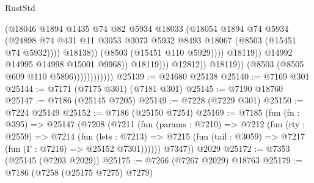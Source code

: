 \begin{lexlean}{RustStd}
\begin{coremodule}
{\begin{coremodule}
{{{{{{{{{{{{{{{{{{{{{{{{{{{{{{{{                                                    (@18046
                                                      @1894
                                                      @1435
                                                      @74
                                                      @82
                                                      @5934
                                                      @18033
                                                      (@18054
                                                        @1894
                                                        @74
                                                        @5934
                                                        (@24898
                                                          @74
                                                          @431
                                                          @11
                                                          @3053
                                                          @3073
                                                          @5932
                                                          @8493
                                                          @18067
                                                          (@8503 (@15451 @74 @5932))))
                                                      @18138))
                                                  (@8503 (@15451 @110 @5929))))
                                              @18119))
                                          @14992
                                          @14995
                                          @14998
                                          @15001
                                          @9968))
                                      @18119)))
                                @12812))
                            @18119))
                        (@8503 (@8505 @609 @110 @5896))))))))))))
@25139 := @24680 @25138
@25140 := @7169 @301
@25144 := @7171 (@7175 @301) (@7181 @301)
@25145 := @7190 @18760
@25147 := @7186 (@25145 @7205)
@25149 := @7228 (@7229 @301)
@25150 := @7224 @25149
@25152 := @7186 (@25150 @7254)
@25169 := @7185
    (fun (fn : @395) =>
    @25147
      (@7208
        (@7211
          (fun (params : @7210) =>
          @7212
            (fun (rty : @2559) =>
            @7214
              (fun (lets : @7213) =>
              @7215 (fun (tail : @3059) => @7217 (fun (Γ : @7216) => @25152 @7301))))))
        @7347))
    @2029
@25172 := @7353 (@25145 (@7203 @2029))
@25175 := @7266 (@7267 @2029) @18763
@25179 := @7186 (@7258 (@25175 @7275) @7279)
}}}}}}}}}}}}}}}}}}}}}}}}}}}}}}}}
\end{coremodule}}
\end{coremodule}
\end{lexlean}
